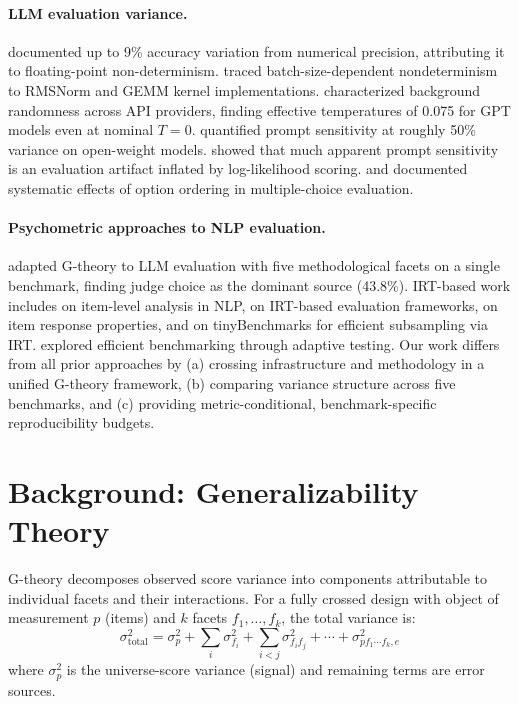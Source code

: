 \documentclass[letterpaper]{article}
\newcommand{\pct}{\%}
\begin{document}
\paragraph{LLM evaluation variance.}
\citet{yuan2025} documented up to 9\pct{} accuracy variation from numerical precision, attributing it to floating-point non-determinism.
\citet{thinkingmachines2025} traced batch-size-dependent nondeterminism to RMSNorm and GEMM kernel implementations.
\citet{messina2026} characterized background randomness across API providers, finding effective temperatures of 0.075 for GPT models even at nominal $T=0$.
\citet{brittlebench2026} quantified prompt sensitivity at roughly 50\pct{} variance on open-weight models.
\citet{hua2025} showed that much apparent prompt sensitivity is an evaluation artifact inflated by log-likelihood scoring.
\citet{lu2022} and \citet{pezeshkpour2024} documented systematic effects of option ordering in multiple-choice evaluation.

\paragraph{Psychometric approaches to NLP evaluation.}
\citet{mesting2026} adapted G-theory to LLM evaluation with five methodological facets on a single benchmark, finding judge choice as the dominant source (43.8\pct{}).
IRT-based work includes \citet{lalor2019} on item-level analysis in NLP, \citet{rodriguez2021} on IRT-based evaluation frameworks, \citet{vania2021} on item response properties, and \citet{polo2024} on tinyBenchmarks for efficient subsampling via IRT.
\citet{perlitz2023} explored efficient benchmarking through adaptive testing.
Our work differs from all prior approaches by (a) crossing infrastructure and methodology in a unified G-theory framework, (b) comparing variance structure across five benchmarks, and (c) providing metric-conditional, benchmark-specific reproducibility budgets.

\section{Background: Generalizability Theory}

G-theory \citep{cronbach1972,shavelson1991,brennan2001} decomposes observed score variance into components attributable to individual facets and their interactions.
For a fully crossed design with object of measurement $p$ (items) and $k$ facets $f_1, \ldots, f_k$, the total variance is:
\begin{equation}
    \sigma^2_{\text{total}} = \sigma^2_p + \sum_i \sigma^2_{f_i} + \sum_{i<j} \sigma^2_{f_i f_j} + \cdots + \sigma^2_{pf_1 \cdots f_k,e}
\end{equation}
where $\sigma^2_p$ is the universe-score variance (signal) and remaining terms are error sources.
\end{document}
